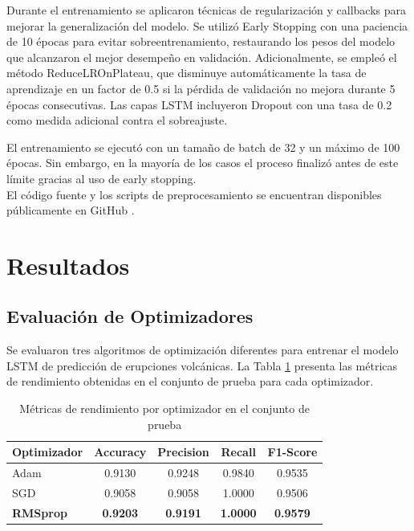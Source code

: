 \documentclass[conference]{IEEEtran}
\begin{document}
Durante el entrenamiento se aplicaron técnicas de regularización y callbacks para mejorar la generalización del modelo. Se utilizó Early Stopping con una paciencia de 10 épocas para evitar sobreentrenamiento, restaurando los pesos del modelo que alcanzaron el mejor desempeño en validación. Adicionalmente, se empleó el método ReduceLROnPlateau, que disminuye automáticamente la tasa de aprendizaje en un factor de 0.5 si la pérdida de validación no mejora durante 5 épocas consecutivas. Las capas LSTM incluyeron Dropout con una tasa de 0.2 como medida adicional contra el sobreajuste.

El entrenamiento se ejecutó con un tamaño de batch de 32 y un máximo de 100 épocas. Sin embargo, en la mayoría de los casos el proceso finalizó antes de este límite gracias al uso de early stopping.\\

El código fuente y los scripts de preprocesamiento se encuentran disponibles públicamente en GitHub \cite{b15}.


\section{Resultados}

\subsection{Evaluación de Optimizadores}

Se evaluaron tres algoritmos de optimización diferentes para entrenar el modelo LSTM de predicción de erupciones volcánicas. La Tabla \ref{tab:metricas} presenta las métricas de rendimiento obtenidas en el conjunto de prueba para cada optimizador.

\begin{table}[H]
\centering
\caption{Métricas de rendimiento por optimizador en el conjunto de prueba}
\label{tab:metricas}
\begin{tabular}{|l|c|c|c|c|}
\hline
\textbf{Optimizador} & \textbf{Accuracy} & \textbf{Precision} & \textbf{Recall} & \textbf{F1-Score} \\
\hline
Adam & 0.9130 & 0.9248 & 0.9840 & 0.9535 \\
SGD & 0.9058 & 0.9058 & 1.0000 & 0.9506 \\
\textbf{RMSprop} & \textbf{0.9203} & \textbf{0.9191} & \textbf{1.0000} & \textbf{0.9579} \\
\hline
\end{tabular}
\end{table}
\end{document}
